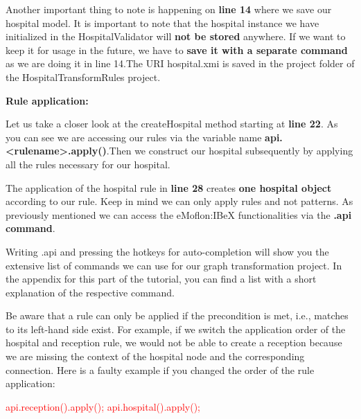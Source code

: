 Another important thing to note is happening on \textbf{line 14} where we save our hospital model. It is important to note that the hospital instance we have initialized in the \textsf{HospitalValidator} will \textbf{not be stored} anywhere. If we want to keep it for usage in the future, we have to \textbf{save it with a separate command} as we are doing it in line 14.\newline The URI \textsf{hospital.xmi} is saved in the project folder of the \textsf{HospitalTransformRules} project.\newline

\textbf{Rule application:}

Let us take a closer look at the \textsf{createHospital} method starting at \textbf{line 22}.\newline
As you can see we are accessing our rules via the variable name \textbf{api.<rulename>.apply()}.\newline Then we construct our hospital subsequently by applying all the rules necessary for our hospital.\newline

The application of the hospital rule in \textbf{line 28} creates \textbf{one hospital object} according to our rule. Keep in mind we can only apply rules and not patterns. As previously mentioned we can access the eMoflon:IBeX functionalities via the \textbf{.api command}.\newline

Writing \textsf{.api} and pressing the hotkeys for auto-completion will show you the extensive list of commands we can use for our graph transformation project. In the appendix for this part of the tutorial, you can find a list with a short explanation of the respective command.\newline

Be aware that a rule can only be applied if the precondition is met, i.e., matches to its left-hand side exist.\newline
For example, if we switch the application order of the hospital and reception rule, we would not be able to create a reception because we are missing the context of the hospital node and the corresponding connection.\newline
Here is a faulty example if you changed the order of the rule application:\newline

\textcolor{red}{api.reception().apply();}\newline
\textcolor{red}{api.hospital().apply();}\newline

